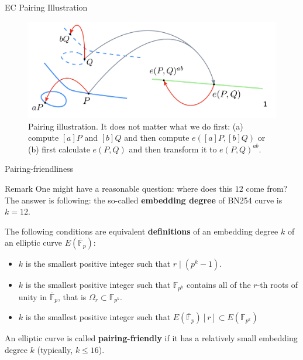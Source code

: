 \documentclass[xcolor={usenames,dvipsnames}]{beamer}
\begin{document}
    \begin{frame}{EC Pairing Illustration}
        \begin{figure}
            \centering
            \includegraphics[width=\textwidth]{images/lecture_4/pairing.png}
            \caption{Pairing illustration. It does not matter what we do first: (a) compute $[a]P$ and $[b]Q$ and then compute $e([a]P,[b]Q)$ or (b) first calculate $e(P,Q)$ and then transform it to $e(P,Q)^{ab}$.}
        \end{figure}
    \end{frame}

    \begin{frame}{Pairing-friendliness}
        \begin{block}{Remark}
            One might have a reasonable question: where does this $12$ come from? The answer is following: the so-called \textbf{embedding degree} of BN254 curve is $k=12$.
        \end{block}
        
        \begin{definition}
            The following conditions are equivalent \textbf{definitions} of an embedding degree $k$ of an elliptic curve $E(\overline{\mathbb{F}}_p)$:
            \begin{itemize}
                \item $k$ is the smallest positive integer such that $r \mid (p^k-1)$.
                \item $k$ is the smallest positive integer such that $\mathbb{F}_{p^k}$ contains all of the $r$-th roots of unity in $\overline{\mathbb{F}}_p$, that is $\Omega_r \subset \mathbb{F}_{p^k}$.
                \item $k$ is the smallest positive integer such that $E(\overline{\mathbb{F}}_p)[r] \subset E(\mathbb{F}_{p^k})$
            \end{itemize}
             An elliptic curve is called \textbf{pairing-friendly} if it has a relatively small embedding degree $k$ (typically, $k \leq 16$).
        \end{definition}
    \end{frame}
\end{document}
